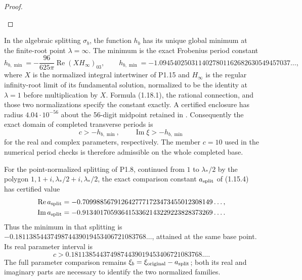 \begin{proof}
\begin{enumerate}[label=\arabic*.]
\end{enumerate}
\end{proof}




\begin{theorem}\label{night:P1.18}
In the algebraic splitting $\sigma_b$, the function $h_b$ has its
unique global minimum at the finite-root point $\lambda=\infty$.
The minimum is the exact Frobenius period constant
\[
 h_{b,\min}=-\frac{96}{625\pi}\operatorname{Re}(XH_\infty)_{03},
 \qquad
 h_{b,\min}=-1.0945402503114027801162682630549457037\ldots,
\tag{1.18.1}
\]
where $X$ is the normalized integral intertwiner of P1.15 and
$H_\infty$ is the regular infinity-root limit of its fundamental
solution, normalized to be the identity at $\lambda=1$ before
multiplication by $X$.  Formula (1.18.1), the rational connection,
and those two normalizations specify the constant exactly.
A certified enclosure has radius $4.04\cdot10^{-56}$ about the
56-digit midpoint retained in
.
Consequently the exact domain of completed transverse periods is
\[
 c>-h_{b,\min},\qquad
 \operatorname{Im}\xi>-h_{b,\min}
\]
for the real and complex parameters, respectively.
The member $c=10$ used in the numerical period checks is therefore
admissible on the whole completed base.

For the point-normalized splitting of P1.8, continued from
$1$ to $\lambda_*/2$ by the polygon
$1,1+i,\lambda_*/2+i,\lambda_*/2$, the exact comparison constant
$a_{\rm split}$ of (1.15.4) has certified value
\[
\begin{split}
 \operatorname{Re}a_{\rm split}
   &=-0.7099885679126427771723473455012308149\ldots,\\
 \operatorname{Im}a_{\rm split}
   &=-0.9134017059364153362143229223828373269\ldots.
\end{split}
\]
Thus the minimum in that splitting is
$-0.1811385443749874439019453406721083768\ldots$,
attained at the same base point.  Its real parameter interval is
\[
 c>0.1811385443749874439019453406721083768\ldots.
\]
The full parameter comparison remains
$\xi_b=\xi_{\rm original}-a_{\rm split}$; both its real and imaginary
parts are necessary to identify the two normalized families.
\end{theorem}

